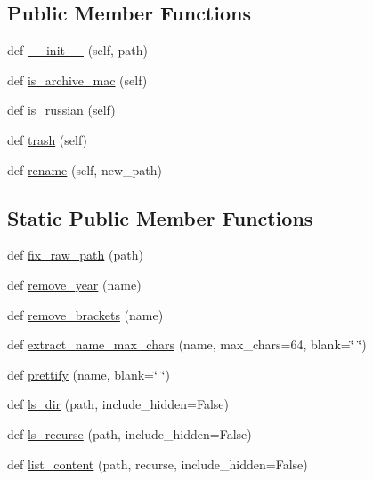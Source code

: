 \subsection*{Public Member Functions}
\begin{DoxyCompactItemize}
\item 
def \hyperlink{classhal_1_1files_1_1models_1_1_file_system_a17bf22e8739c0abe81a1736115ff6778}{\+\_\+\+\_\+init\+\_\+\+\_\+} (self, path)
\item 
def \hyperlink{classhal_1_1files_1_1models_1_1_file_system_a7b176e08ad6531bcc9caa04c44df1944}{is\+\_\+archive\+\_\+mac} (self)
\item 
def \hyperlink{classhal_1_1files_1_1models_1_1_file_system_a073400419be263c865c0971136d2898b}{is\+\_\+russian} (self)
\item 
def \hyperlink{classhal_1_1files_1_1models_1_1_file_system_a98912c19e86d13c67b0a9bb70682026c}{trash} (self)
\item 
def \hyperlink{classhal_1_1files_1_1models_1_1_file_system_a3388d434e8ae2be2f2b7b9a227ac418e}{rename} (self, new\+\_\+path)
\end{DoxyCompactItemize}
\subsection*{Static Public Member Functions}
\begin{DoxyCompactItemize}
\item 
def \hyperlink{classhal_1_1files_1_1models_1_1_file_system_a7fe20d282e84a1ad292f7e04de6d335d}{fix\+\_\+raw\+\_\+path} (path)
\item 
def \hyperlink{classhal_1_1files_1_1models_1_1_file_system_af473fc3f0450ffe57c2484fd76d3a40d}{remove\+\_\+year} (name)
\item 
def \hyperlink{classhal_1_1files_1_1models_1_1_file_system_ab97d14ce121829510e40c3f052c176df}{remove\+\_\+brackets} (name)
\item 
def \hyperlink{classhal_1_1files_1_1models_1_1_file_system_a809f1abc2282567f89f809a510e7d665}{extract\+\_\+name\+\_\+max\+\_\+chars} (name, max\+\_\+chars=64, blank=\char`\"{} \char`\"{})
\item 
def \hyperlink{classhal_1_1files_1_1models_1_1_file_system_adc5cc642a247ed7cb24f98341d3e1a8b}{prettify} (name, blank=\char`\"{} \char`\"{})
\item 
def \hyperlink{classhal_1_1files_1_1models_1_1_file_system_a60f66aeec22d00b67067f3527d06db74}{ls\+\_\+dir} (path, include\+\_\+hidden=False)
\item 
def \hyperlink{classhal_1_1files_1_1models_1_1_file_system_a2df7cb545b239ccb239b71f808ce5808}{ls\+\_\+recurse} (path, include\+\_\+hidden=False)
\item 
def \hyperlink{classhal_1_1files_1_1models_1_1_file_system_a10b078501fd008d3991f7aacf6464540}{list\+\_\+content} (path, recurse, include\+\_\+hidden=False)
\end{DoxyCompactItemize}
